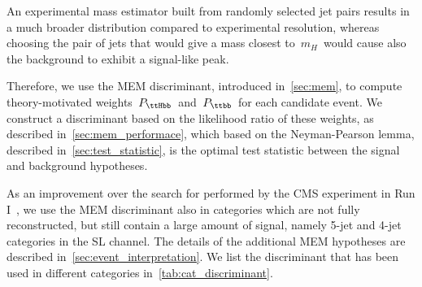 An experimental mass estimator built from randomly selected jet pairs results in a much broader distribution compared to experimental resolution, whereas choosing the pair of jets that would give a mass closest to~$m_H$~would cause also the background to exhibit a signal-like peak.

Therefore, we use the MEM discriminant, introduced in~\cref{sec:mem}, to compute theory-motivated weights~$P_{\ttHbb}$~and~$P_{\ttbb}$~for each candidate event. We construct a discriminant based on the likelihood ratio of these weights, as described in~\cref{sec:mem_performace}, which based on the Neyman-Pearson lemma, described in~\cref{sec:test_statistic}, is the optimal test statistic between the signal and background hypotheses.

As an improvement over the search for \ttHbb performed by the CMS experiment in Run I~\cite{Khachatryan:2015ila}, we use the MEM discriminant also in categories which are not fully reconstructed, but still contain a large amount of signal, namely 5-jet and 4-jet categories in the SL channel. The details of the additional MEM hypotheses are described in~\cref{sec:event_interpretation}. We list the discriminant that has been used in different categories in~\cref{tab:cat_discriminant}. 



